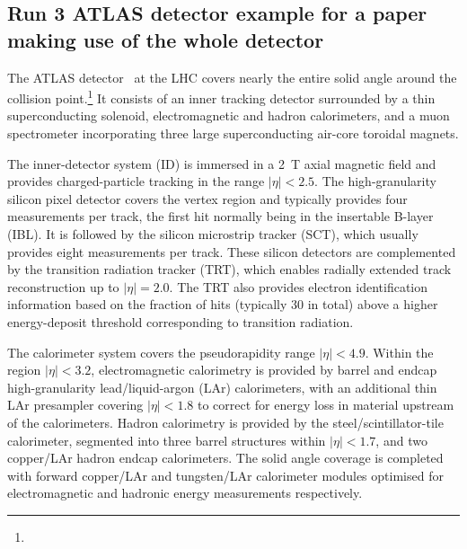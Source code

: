 \subsection{Run 3 ATLAS detector example for a paper making use of the whole detector}
\label{sec:atlas3b}

The ATLAS detector~\cite{PERF-2007-01,GENR-2019-02} at the LHC covers nearly the entire solid angle around the collision point.\footnote{\AtlasCoordFootnote}
It consists of an inner tracking detector surrounded by a thin superconducting solenoid, electromagnetic and hadron calorimeters,
and a muon spectrometer incorporating three large superconducting air-core toroidal magnets.

The inner-detector system (ID) is immersed in a \qty{2}{\tesla} axial magnetic field 
and provides charged-particle tracking in the range \(|\eta| < 2.5\).
The high-granularity silicon pixel detector covers the vertex region and typically provides four measurements per track, 
the first hit normally being in the insertable B-layer (IBL). %
It is followed by the silicon microstrip tracker (SCT), which usually provides eight measurements per track.
These silicon detectors are complemented by the transition radiation tracker (TRT),
which enables radially extended track reconstruction up to \(|\eta| = 2.0\). 
The TRT also provides electron identification information 
based on the fraction of hits (typically 30 in total) above a higher energy-deposit threshold corresponding to transition radiation.

The calorimeter system covers the pseudorapidity range \(|\eta| < 4.9\).
Within the region \(|\eta|< 3.2\), electromagnetic calorimetry is provided by barrel and 
endcap high-granularity lead/liquid-argon (LAr) calorimeters,
with an additional thin LAr presampler covering \(|\eta| < 1.8\)
to correct for energy loss in material upstream of the calorimeters.
Hadron calorimetry is provided by the steel/scintillator-tile calorimeter,
segmented into three barrel structures within \(|\eta| < 1.7\), and two copper/LAr hadron endcap calorimeters.
The solid angle coverage is completed with forward copper/LAr and tungsten/LAr calorimeter modules
optimised for electromagnetic and hadronic energy measurements respectively.

